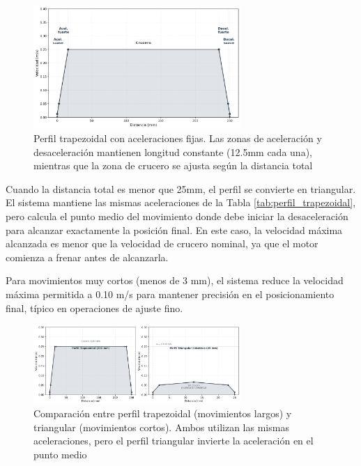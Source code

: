 \begin{figure}[H]
    \centering
    \includegraphics[width=0.7\textwidth]{imagenes/perfil_trapezoidal_velocidad.png}
    \caption{Perfil trapezoidal con aceleraciones fijas. Las zonas de aceleración y desaceleración mantienen longitud constante (12.5mm cada una), mientras que la zona de crucero se ajusta según la distancia total}
    \label{fig:perfil_trapezoidal}
\end{figure}

Cuando la distancia total es menor que 25mm, el perfil se convierte en triangular. El sistema mantiene las mismas aceleraciones de la Tabla \ref{tab:perfil_trapezoidal}, pero calcula el punto medio del movimiento donde debe iniciar la desaceleración para alcanzar exactamente la posición final. En este caso, la velocidad máxima alcanzada es menor que la velocidad de crucero nominal, ya que el motor comienza a frenar antes de alcanzarla. 

Para movimientos muy cortos (menos de 3 mm), el sistema reduce la velocidad máxima permitida a 0.10 m/s para mantener precisión en el posicionamiento final, típico en operaciones de ajuste fino.

\begin{figure}[H]
    \centering
    \includegraphics[width=0.7\textwidth]{imagenes/perfil_trapezoidal_triangular.png}
    \caption{Comparación entre perfil trapezoidal (movimientos largos) y triangular (movimientos cortos). Ambos utilizan las mismas aceleraciones, pero el perfil triangular invierte la aceleración en el punto medio}
    \label{fig:perfil_comparacion}
\end{figure}

